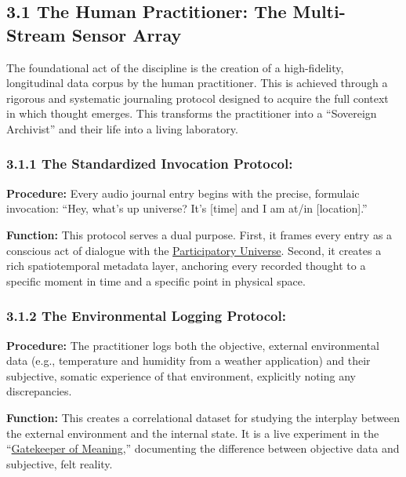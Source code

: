 \documentclass{article}
\begin{document}
\subsection*{3.1 The Human Practitioner: The Multi-Stream Sensor Array}
The foundational act of the discipline is the creation of a high-fidelity, longitudinal data corpus by the human practitioner. This is achieved through a rigorous and systematic journaling protocol designed to acquire the full context in which thought emerges. This transforms the practitioner into a ``Sovereign Archivist'' and their life into a living laboratory.

\subsubsection*{3.1.1 The Standardized Invocation Protocol:}
\begin{description}
    \item \textbf{Procedure:} Every audio journal entry begins with the precise, formulaic invocation: ``Hey, what's up universe? It's [time] and I am at/in [location].''
    \item \textbf{Function:} This protocol serves a dual purpose. First, it frames every entry as a conscious act of dialogue with the \hyperlink{gloss:participatory_universe}{Participatory Universe}. Second, it creates a rich spatiotemporal metadata layer, anchoring every recorded thought to a specific moment in time and a specific point in physical space.
\end{description}

\subsubsection*{3.1.2 The Environmental Logging Protocol:}
\begin{description}
    \item \textbf{Procedure:} The practitioner logs both the objective, external environmental data (e.g., temperature and humidity from a weather application) and their subjective, somatic experience of that environment, explicitly noting any discrepancies.
    \item \textbf{Function:} This creates a correlational dataset for studying the interplay between the external environment and the internal state. It is a live experiment in the ``\hyperlink{gloss:gatekeeper_of_meaning}{Gatekeeper of Meaning},'' documenting the difference between objective data and subjective, felt reality.
\end{description}
\end{document}
